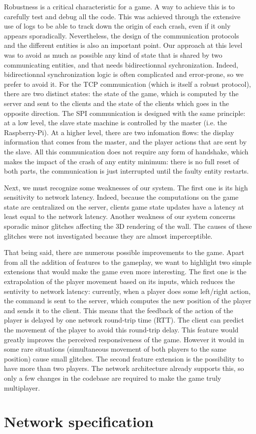 \documentclass[english, DIV=13]{scrreprt}
\begin{document}
Robustness is a critical characteristic for a game. A way to achieve this is to
carefully test and debug all the code. This
was achieved through the extensive use of logs to be able to track down the
origin of each crash, even if it only appears sporadically. Nevertheless, the
design of the communication protocols and the different entities is also an
important point. Our approach at this level was to avoid as much as possible any
kind of state that is shared by two communicating entities, and that needs
bidirectionnal sychronization. Indeed, bidirectionnal synchronization logic is often
complicated and error-prone, so we prefer to avoid it. For the TCP
communication (which is itself a robust protocol), there are two distinct
states: the state of the game, which is computed by the server and sent to the
clients and the state of the clients which goes in the opposite direction. The SPI
communication is designed with the same principle: at a low level, the slave state
machine is controlled by the master (i.e. the Raspberry-Pi). At a higher level,
there are two infomation flows: the display information that comes from the
master, and the player actions that are sent by the slave. All this
communication does not require any form of handshake, which makes the impact of
the crash of any entity minimum: there is no full reset of both parts, the
communication is just interrupted until the faulty entity restarts.

Next, we must recognize some weaknesses of our system. The first one is its
high sensitivity to network latency. Indeed, because the computations on the game state
are centralized on the server, clients game state updates have a latency at least equal
to the network latency.
Another weakness of our system concerns sporadic minor glitches affecting the 3D rendering
of the wall. The causes of these glitches were not investigated because they are almost
imperceptible.

That being said, there are numerous possible improvements to the game. Apart
from all the addition of features to the gameplay, we want to highlight two
simple extensions that would make the game even more interesting. The first one
is the extrapolation of the player movement based on its inputs, which reduces the
sentivity to network latency: currently, when
a player does some left/right action, the command is sent to the server, which
computes the new position of the player and sends it to the client. This means
that the feedback of the action of the player is delayed by one network
round-trip time (RTT). The client can predict the movement of the player to
avoid this round-trip delay. This feature would greatly improves the perceived
responsiveness of the game. However it would in some rare situations
(simultaneous movement of both players to the same position) cause small
glitches. The second feature extension is the possibility to have more than two
players. The network architecture already supports this, so only a few
changes in the codebase are required to make the game truly multiplayer.

\appendix

\chapter{Network specification}
\label{app:protocol}




\end{document}
